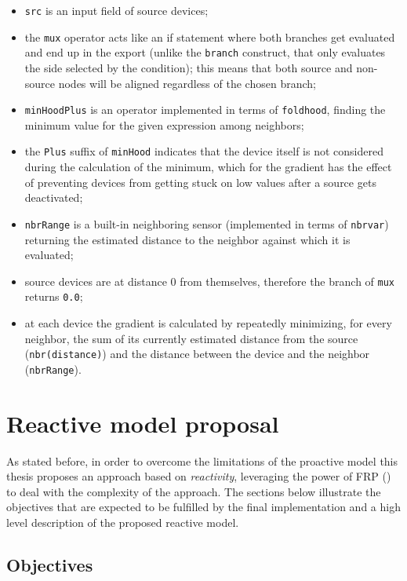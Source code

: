 \begin{itemize}
    \item \texttt{src} is an input field of source devices;
    \item the \texttt{mux} operator acts like an if statement where both branches get evaluated and end up in the export (unlike the \texttt{branch} construct, that only evaluates the side selected by the condition); this means that both source and non-source nodes will be aligned regardless of the chosen branch;
    \item \texttt{minHoodPlus} is an operator implemented in terms of \texttt{foldhood}, finding the minimum value for the given expression among neighbors;
    \item the \texttt{Plus} suffix of \texttt{minHood} indicates that the device itself is not considered during the calculation of the minimum, which for the gradient has the effect of preventing devices from getting stuck on low values after a source gets deactivated;
    \item \texttt{nbrRange} is a built-in neighboring sensor (implemented in terms of \texttt{nbrvar}) returning the estimated distance to the neighbor against which it is evaluated;
    \item source devices are at distance 0 from themselves, therefore the  branch of \texttt{mux} returns \texttt{0.0};
    \item at each device the gradient is calculated by repeatedly minimizing, for every neighbor, the sum of its currently estimated distance from the source (\texttt{nbr(distance)}) and the distance between the device and the neighbor (\texttt{nbrRange}).
\end{itemize}

\section{Reactive model proposal}
\label{sec:proposed-model}

As stated before, in order to overcome the limitations of the proactive model this thesis proposes an approach based on \textit{reactivity}, leveraging the power of FRP () to deal with the complexity of the approach.
%
The sections below illustrate the objectives that are expected to be fulfilled by the final implementation and a high level description of the proposed reactive model.

\subsection{Objectives}
\label{sec:objectives}

